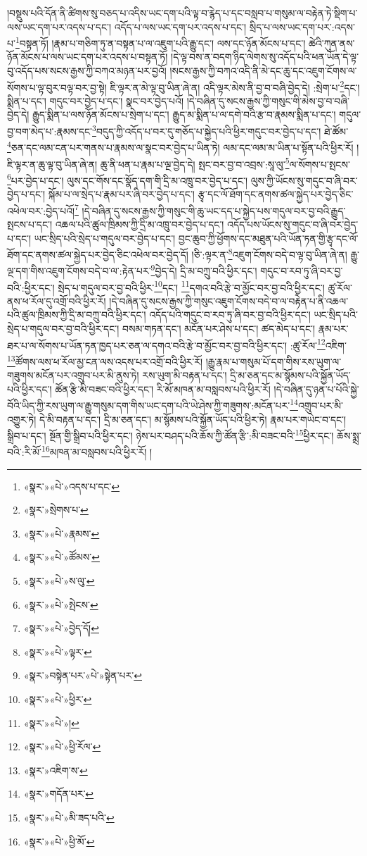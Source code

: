 །བསྡུས་པའི་དོན་ནི་ཚིགས་སུ་བཅད་པ་འདིས་ཡང་དག་པའི་ལྟ་བ་རྙེད་པ་དང་བསླབ་པ་གསུམ་ལ་བརྟེན་ཏེ་སྡིག་པ་ལས་ཡང་དག་པར་འདས་པ་དང་། འདོད་པ་ལས་ཡང་དག་པར་འདས་པ་དང་། སྲིད་པ་ལས་ཡང་དག་པར་:འདས་པ་\footnote{«སྣར་»«པེ་»འདས་པ་དང་}བསྟན་ཏོ། །རྣམ་པ་གཅིག་ཏུ་ན་བསྟན་པ་ལ་འཇུག་པའི་རྒྱུ་དང་། ལས་དང་ཉོན་མོངས་པ་དང་། ཚེའི་ཀུན་ནས་ཉོན་མོངས་པ་ལས་ཡང་དག་པར་འདས་པ་བསྟན་ཏོ། །དེ་ལྟ་བས་ན་བདག་ཉིད་ལེགས་སུ་འདོད་པའི་ཕན་ཡོན་དེ་ལྟ་བུ་འདོད་པས་སངས་རྒྱས་ཀྱི་བཀའ་མཉན་པར་བྱའོ། །སངས་རྒྱས་ཀྱི་བཀའ་འདི་ནི་མེ་དང་ཆུ་དང་འཇུག་ངོགས་ལ་སོགས་པ་ལྟ་བུར་བལྟ་བར་བྱ་སྟེ། ཇི་ལྟར་ན་མེ་ལྟ་བུ་ཡིན་ཞེ་ན། འདི་ལྟར་མེས་ནི་བྱ་བ་བཞི་བྱེད་དེ། :སྲེག་པ་\footnote{«སྣར་»སྲེགས་པ་}དང་། སྨིན་པ་དང་། གདུང་བར་བྱེད་པ་དང་། སྣང་བར་བྱེད་པའོ། །དེ་བཞིན་དུ་སངས་རྒྱས་ཀྱི་གསུང་གི་མེས་བྱ་བ་བཞི་བྱེད་དེ། རྒྱུད་སྨིན་པ་ལས་ཉོན་མོངས་པ་སྲེག་པ་དང་། རྒྱུད་མ་སྨིན་པ་ལ་དགེ་བའི་རྩ་བ་རྣམས་སྨིན་པ་དང་། གདུལ་བྱ་བག་མེད་པ་:རྣམས་དང་\footnote{«སྣར་»«པེ་»རྣམས་}བདུད་ཀྱི་འདོད་པ་བར་དུ་གཅོད་པ་སྐྱེད་པའི་ཕྱིར་གདུང་བར་བྱེད་པ་དང་། ཐེ་ཚོམ་\footnote{«སྣར་»«པེ་»ཚོམས་}ཅན་དང་ལམ་ངན་པར་གནས་པ་རྣམས་ལ་སྣང་བར་བྱེད་པ་ཡིན་ཏེ། ལམ་དང་ལམ་མ་ཡིན་པ་སྟོན་པའི་ཕྱིར་རོ། །ཇི་ལྟར་ན་ཆུ་ལྟ་བུ་ཡིན་ཞེ་ན། ཆུ་ནི་ཕན་པ་རྣམ་པ་ལྔ་བྱེད་དེ། སྤང་བར་བྱ་བ་འབྲས་:སཱ་ལུ་\footnote{«སྣར་»«པེ་»ས་ལུ་}ལ་སོགས་པ་སྤངས་\footnote{«སྣར་»«པེ་»སྤེངས་}པར་བྱེད་པ་དང་། ལུས་དང་གོས་དང་སྣོད་དག་གི་དྲི་མ་འཁྲུ་བར་བྱེད་པ་དང་། ལུས་ཀྱི་ཡོངས་སུ་གདུང་བ་ཞི་བར་བྱེད་པ་དང་། སྐོམ་པ་ལ་སྲེད་པ་རྣམ་པར་ཞི་བར་བྱེད་པ་དང་། རྩྭ་དང་ལོ་ཐོག་དང་ནགས་ཚལ་སྐྱེད་པར་བྱེད་ཅིང་འཕེལ་བར་:བྱེད་པའོ།\footnote{«སྣར་»«པེ་»བྱེད་དོ།} །དེ་བཞིན་དུ་སངས་རྒྱས་ཀྱི་གསུང་གི་ཆུ་ཡང་དད་པ་སྐྱེད་པས་གདུལ་བར་བྱ་བའི་རྒྱུད་སྤངས་པ་དང་། འཆལ་པའི་ཚུལ་ཁྲིམས་ཀྱི་དྲི་མ་འཁྲུ་བར་བྱེད་པ་དང་། འདོད་པས་ཡོངས་སུ་གདུང་བ་ཞི་བར་བྱེད་པ་དང་། ཡང་སྲིད་པའི་སྲེད་པ་གདུལ་བར་བྱེད་པ་དང་། བྱང་ཆུབ་ཀྱི་ཕྱོགས་དང་མཐུན་པའི་ཡོན་ཏན་གྱི་རྩྭ་དང་ལོ་ཐོག་དང་ནགས་ཚལ་སྐྱེད་པར་བྱེད་ཅིང་འཕེལ་བར་བྱེད་དོ། །ཅི་:ལྟར་ན་\footnote{«སྣར་»«པེ་»ལྟར་}འཇུག་ངོགས་བདེ་བ་ལྟ་བུ་ཡིན་ཞེ་ན། རྒྱུ་ལྔ་དག་གིས་འཇུག་ངོགས་བདེ་བ་ལ་:རྟེན་པར་\footnote{«སྣར་»བསྟེན་པར་«པེ་»སྟེན་པར་}བྱེད་དེ། དྲི་མ་བཀྲུ་བའི་ཕྱིར་དང་། གདུང་བ་རབ་ཏུ་ཞི་བར་བྱ་བའི་:ཕྱིར་དང་། སྲེད་པ་གདུལ་བར་བྱ་བའི་ཕྱིར་\footnote{«སྣར་»«པེ་»ཕྱིར་}དང་། \footnote{«སྣར་»«པེ་»།  }དགའ་བའི་རྩེ་བ་མྱོང་བར་བྱ་བའི་ཕྱིར་དང་། ཚུ་རོལ་ནས་ཕ་རོལ་དུ་འགྲོ་བའི་ཕྱིར་རོ། །དེ་བཞིན་དུ་སངས་རྒྱས་ཀྱི་གསུང་འཇུག་ངོགས་བདེ་བ་ལ་བརྟེན་པ་ནི་འཆལ་པའི་ཚུལ་ཁྲིམས་ཀྱི་དྲི་མ་བཀྲུ་བའི་ཕྱིར་དང་། འདོད་པའི་གདུང་བ་རབ་ཏུ་ཞི་བར་བྱ་བའི་ཕྱིར་དང་། ཡང་སྲིད་པའི་སྲེད་པ་གདུལ་བར་བྱ་བའི་ཕྱིར་དང་། བསམ་གཏན་དང་། མངོན་པར་ཤེས་པ་དང་། ཚད་མེད་པ་དང་། རྣམ་པར་ཐར་པ་ལ་སོགས་པ་ཡོན་ཏན་ཁྱད་པར་ཅན་ལ་དགའ་བའི་རྩེ་བ་མྱོང་བར་བྱ་བའི་ཕྱིར་དང་། :ཚུ་རོལ་\footnote{«སྣར་»«པེ་»ཕྱི་རོལ་}འཇིག་\footnote{«སྣར་»འཇིག་ས་}ཚོགས་ལས་ཕ་རོལ་མྱ་ངན་ལས་འདས་པར་འགྲོ་བའི་ཕྱིར་རོ། །རྒྱུ་རྣམ་པ་གསུམ་པོ་དག་གིས་རས་ཡུག་ལ་གཟུགས་མངོན་པར་འགྲུབ་པར་མི་ནུས་ཏེ། རས་ཡུག་མི་བརྟན་པ་དང་། དྲི་མ་ཅན་དང་མ་སྙོམས་པའི་སྐྱོན་ཡོད་པའི་ཕྱིར་དང་། ཚོན་རྩི་མི་བཟང་བའི་ཕྱིར་དང་། རི་མོ་མཁན་མ་བསླབས་པའི་ཕྱིར་རོ། །དེ་བཞིན་དུ་ཉན་པ་པོའི་སྐྱེ་བོའི་ཡིད་ཀྱི་རས་ཡུག་ལ་རྒྱུ་གསུམ་དག་གིས་ཡང་དག་པའི་ཡེ་ཤེས་ཀྱི་གཟུགས་:མངོན་པར་\footnote{«སྣར་»གདོན་པར་}འགྲུབ་པར་མི་འགྱུར་ཏེ། དེ་མི་བརྟན་པ་དང་། དྲི་མ་ཅན་དང་། མ་སྙོམས་པའི་སྐྱོན་ཡོད་པའི་ཕྱིར་ཏེ། རྣམ་པར་གཡེང་བ་དང་། སྒྲིབ་པ་དང་། སྔོན་གྱི་སྒྲིབ་པའི་ཕྱིར་དང་། ཉེས་པར་བཤད་པའི་ཆོས་ཀྱི་ཚོན་རྩི་:མི་བཟང་བའི་\footnote{«སྣར་»«པེ་»མི་ཟད་པའི་}ཕྱིར་དང་། ཆོས་སྨྲ་བའི་:རི་མོ་\footnote{«སྣར་»«པེ་»ཕྱི་མོ་}མཁན་མ་བསླབས་པའི་ཕྱིར་རོ། །
